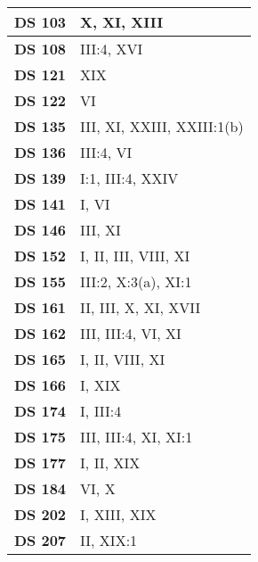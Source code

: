 \begin{xltabular}{\linewidth}{ l | X }
    \textbf {DS 103} & X, XI, XIII \\ \hline

    \textbf {DS 108} & III:4, XVI \\ \hline

    \textbf {DS 121} & XIX \\ \hline

    \textbf {DS 122} & VI \\ \hline

    \textbf {DS 135} & III, XI, XXIII, XXIII:1(b) \\ \hline

    \textbf {DS 136} & III:4, VI \\ \hline

    \textbf {DS 139} & I:1, III:4, XXIV \\ \hline

    \textbf {DS 141} & I, VI \\ \hline

    \textbf {DS 146} & III, XI \\ \hline

    \textbf {DS 152} & I, II, III, VIII, XI \\ \hline

    \textbf {DS 155} & III:2, X:3(a), XI:1 \\ \hline

    \textbf {DS 161} & II, III, X, XI, XVII \\ \hline

    \textbf {DS 162} & III, III:4, VI, XI \\ \hline

    \textbf {DS 165} & I, II, VIII, XI \\ \hline

    \textbf {DS 166} & I, XIX \\ \hline

    \textbf {DS 174} & I, III:4 \\ \hline

    \textbf {DS 175} & III, III:4, XI, XI:1 \\ \hline

    \textbf {DS 177} & I, II, XIX \\ \hline

    \textbf {DS 184} & VI, X \\ \hline

    \textbf {DS 202} & I, XIII, XIX \\ \hline

    \textbf {DS 207} & II, XIX:1 \\ \hline


\end{xltabular}
